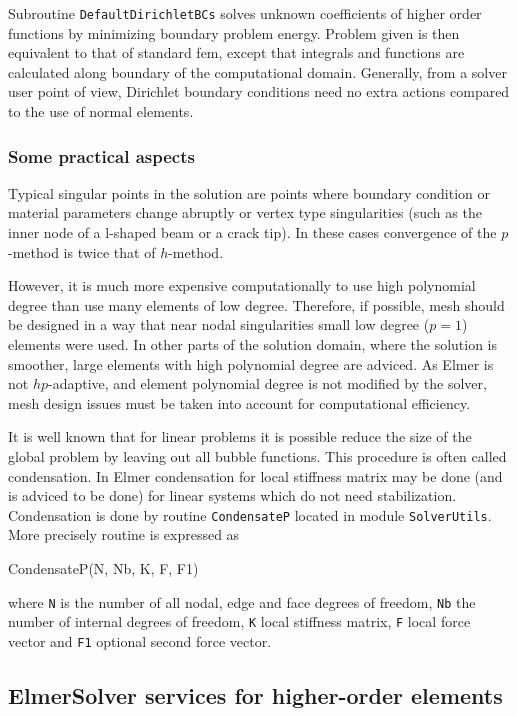 Subroutine \texttt{DefaultDirichletBCs} solves unknown coefficients of higher order functions by minimizing boundary problem energy. Problem given is then equivalent to that of standard fem, except that integrals and functions are calculated along boundary of the computational domain. Generally, from a solver user point of view, Dirichlet boundary conditions need no extra actions compared to the use of normal elements. 

\subsubsection{Some practical aspects}

Typical singular points in the solution are points where boundary condition or material parameters change abruptly or vertex type singularities (such as the inner node of a l-shaped beam or a crack tip). In these cases convergence of the $p$-method is twice that of $h$-method. 

However, it is much more expensive computationally to use high polynomial degree than use many elements of low degree. Therefore, if possible,  mesh should be designed in a way that near nodal singularities small low degree ($p=1$) elements were used. In other parts of the solution domain, where the solution is smoother, large elements with high polynomial degree are adviced. As Elmer is not $hp$-adaptive, and element polynomial degree is not modified by the solver, mesh design issues must be taken into account for computational efficiency. 

It is well known that for linear problems it is possible reduce the size of the global problem by leaving out all bubble functions. This procedure is often called condensation. In Elmer condensation for local stiffness matrix may be done (and is adviced to be done) for linear systems which do not need stabilization. Condensation is done by routine \texttt{CondensateP} located in module \texttt{SolverUtils}. More precisely routine is expressed as

\ttbegin
CondensateP(N, Nb, K, F, F1)
\ttend

\noindent where \texttt{N} is the number of all nodal, edge and face degrees of freedom, \texttt{Nb} the number of internal degrees of freedom, \texttt{K} local stiffness matrix, \texttt{F} local force vector and \texttt{F1} optional second force vector.

\subsection{ElmerSolver services for higher-order elements} 

